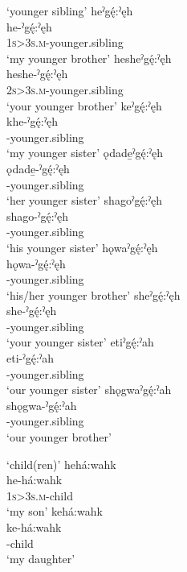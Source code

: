 \ea\label{ex:samegeninlawex}  ‘younger sibling’
\ea heˀgę́:ˀęh\\
\gll he-ˀgę́:ˀęh\\
 \textsc{1s>3s.m}-younger.sibling\\
\glt `my younger brother'
\ex hesheˀgę́:ˀęh\\
\gll heshe-ˀgę́:ˀęh\\
 \textsc{2s>3s.m}-younger.sibling\\
\glt `your younger brother'
\newpage
\ex keˀgę́:ˀęh\\
\gll khe-ˀgę́:ˀęh\\
 -younger.sibling\\
\glt `my younger sister'
\ex ǫdade̱ˀgę́:ˀęh\\
\gll ǫdade̱-ˀgę́:ˀęh\\
 -younger.sibling\\
\glt `her younger sister'
\ex shagoˀgę́:ˀęh\\
\gll shago-ˀgę́:ˀęh\\
 -younger.sibling\\
\glt `his younger sister'
\ex hǫwaˀgę́:ˀęh\\
\gll hǫwa-ˀgę́:ˀęh\\
 -younger.sibling\\
\glt `his/her younger brother'
\ex sheˀgę́:ˀęh\\
\gll she-ˀgę́:ˀęh\\
 -younger.sibling\\
\glt `your younger sister'
\ex etiˀgę́:ˀah\\
\gll eti-ˀgę́:ˀah\\
 -younger.sibling\\
\glt `our younger sister'
\ex shǫgwaˀgę́:ˀah\\
\gll shǫgwa-ˀgę́:ˀah\\
-younger.sibling\\
\glt `our younger brother'
\z
\z

\ea\label{ex:interkintermppex4}  ‘child(ren)’
\ea hehá:wahk\\
\gll he-há:wahk\\
 \textsc{1s>3s.m}-child\\
\glt `my son'
\newpage
\ex kehá:wahk\\
\gll ke-há:wahk\\
 -child\\
\glt `my daughter'
\z
\z

